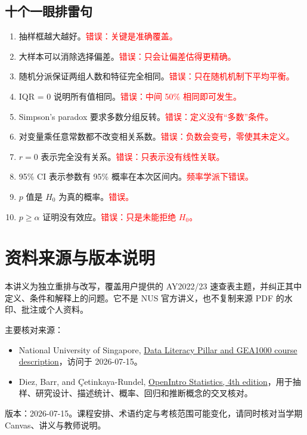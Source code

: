 \documentclass[11pt,a4paper,fontset=fandol]{ctexart}
\begin{document}
\subsection*{十个一眼排雷句}

\begin{enumerate}
  \item 抽样框越大越好。\hfill\textcolor{Red}{错误：关键是准确覆盖。}
  \item 大样本可以消除选择偏差。\hfill\textcolor{Red}{错误：只会让偏差估得更精确。}
  \item 随机分派保证两组人数和特征完全相同。\hfill\textcolor{Red}{错误：只在随机机制下平均平衡。}
  \item IQR = 0 说明所有值相同。\hfill\textcolor{Red}{错误：中间 50\% 相同即可发生。}
  \item Simpson's paradox 要求多数分组反转。\hfill\textcolor{Red}{错误：定义没有“多数”条件。}
  \item 对变量乘任意常数都不改变相关系数。\hfill\textcolor{Red}{错误：负数会变号，零使其未定义。}
  \item $r=0$ 表示完全没有关系。\hfill\textcolor{Red}{错误：只表示没有线性关联。}
  \item 95\% CI 表示参数有 95\% 概率在本次区间内。\hfill\textcolor{Red}{频率学派下错误。}
  \item $p$ 值是 $H_0$ 为真的概率。\hfill\textcolor{Red}{错误。}
  \item $p\geq\alpha$ 证明没有效应。\hfill\textcolor{Red}{错误：只是未能拒绝 $H_0$。}
\end{enumerate}

\section*{资料来源与版本说明}

本讲义为独立重排与改写，覆盖用户提供的 AY2022/23 速查表主题，并纠正其中定义、条件和解释上的问题。它不是 NUS 官方讲义，也不复制来源 PDF 的水印、批注或个人资料。

主要核对来源：
\begin{itemize}
  \item National University of Singapore, \href{https://nus.edu.sg/registrar/academic-information-policies/undergraduate-students/general-education/data-literacy-pillar}{Data Literacy Pillar and GEA1000 course description}，访问于 2026-07-15。
  \item Diez, Barr, and Çetinkaya-Rundel, \href{https://www.openintro.org/book/os/}{OpenIntro Statistics, 4th edition}，用于抽样、研究设计、描述统计、概率、回归和推断概念的交叉核对。
\end{itemize}

\vfill
{\footnotesize\color{Ink!70}
版本：2026-07-15。课程安排、术语约定与考核范围可能变化，请同时核对当学期 Canvas、讲义与教师说明。}
\end{document}
